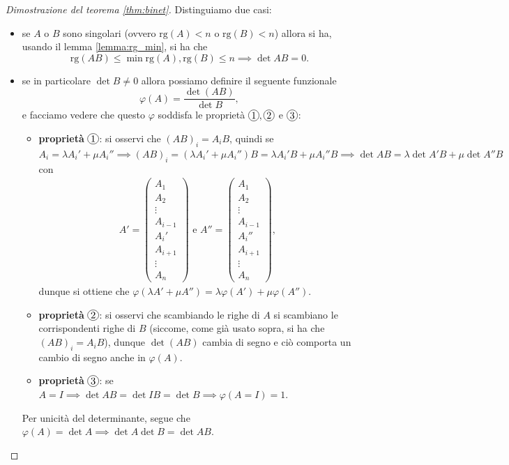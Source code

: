 \begin{proof}[Dimostrazione del teorema \ref{thm:binet}]
    Distinguiamo due casi:
    \begin{itemize}
        \item se $A$ o $B$ sono singolari (ovvero $\text{rg}(A) < n$ o $\text{rg}(B) < n$) allora si ha, usando il lemma \ref{lemma:rg_min}, si ha che
        $$
            \text{rg}(AB) \leq \min{\text{rg}(A), \text{rg}(B)} \leq n \implies \det{AB} = 0.
        $$
        \item se in particolare $\det{B} \neq 0$ allora possiamo definire il seguente funzionale
        $$
            \varphi(A) = \frac{\det(AB)}{\det{B}},
        $$
        e facciamo vedere che questo $\varphi$ soddisfa le proprietà $\circled{1}, \circled{2}$ e $\circled{3}$:
        \begin{itemize}
            \item \textbf{proprietà} $\circled{1}$: si osservi che $(AB)_i = A_i B$, quindi se $A_i = \lambda A_i' + \mu A_i'' \implies (AB)_i = (\lambda A_i' + \mu A_i'') B = \lambda A_i' B + \mu A_i'' B \implies \det{AB} = \lambda \det{A'B} + \mu \det{A''B}$ con
            \begin{align} 
                A'=\begin{pmatrix}
                A_1 \\ A_2 \\ \vdots \\ A_{i-1} \\ A_i' \\ A_{i+1} \\ \vdots \\ A_n
            \end{pmatrix} \text{ e } A'' = \begin{pmatrix}
                A_1 \\ A_2 \\ \vdots \\ A_{i-1} \\ A_i'' \\ A_{i+1} \\ \vdots \\ A_n
            \end{pmatrix},
            \end{align}
            dunque si ottiene che $\varphi(\lambda A' + \mu A'') = \lambda \varphi(A') + \mu \varphi(A'')$.
            \item \textbf{proprietà} $\circled{2}$: si osservi che scambiando le righe di $A$ si scambiano le corrispondenti righe di $B$ (siccome, come già usato sopra, si ha che $(AB)_i = A_i B$), dunque $\det{(AB)}$ cambia di segno e ciò comporta un cambio di segno anche in $\varphi(A)$.
            \item \textbf{proprietà} $\circled{3}$: se $A=I \implies \det{AB} = \det{IB} = \det{B} \implies \varphi(A=I) = 1$.
        \end{itemize}
        Per unicità del determinante, segue che $\varphi(A) = \det{A} \implies \det{A}\det{B} = \det{AB}.$
    \end{itemize}
\end{proof}
